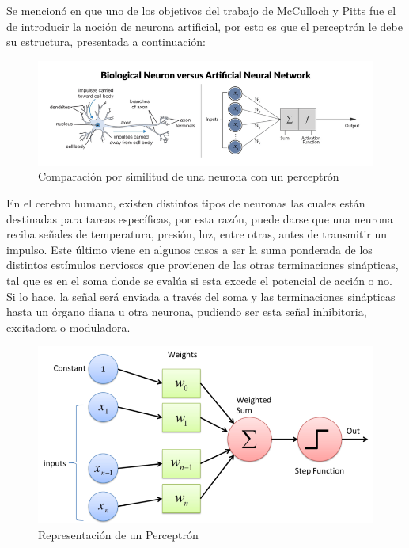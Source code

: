 \begin{itemize}
{\begin{enumerate}
\begin{enumerate}
{             Se mencionó en \cite{29} que uno de los objetivos del trabajo de McCulloch y Pitts fue el de introducir la noción de neurona artificial, por esto es que el perceptrón le debe su estructura, presentada a continuación:
             
            \begin{figure}[h!]
                \centering
                \includegraphics[scale=0.5]{./images/nn}
                \caption{Comparación por similitud de una neurona con un perceptrón}
                \label{fig:NN}
            \end{figure}
            
            En el cerebro humano, existen distintos tipos de neuronas las cuales están destinadas para tareas específicas, por esta razón, puede darse que una neurona reciba señales de temperatura, presión, luz, entre otras, antes de transmitir un impulso. Este último viene en algunos casos a ser la suma ponderada de los distintos estímulos nerviosos que provienen de las otras terminaciones sinápticas, tal que es en el soma donde se evalúa si esta excede el potencial de acción o no. Si lo hace, la señal será enviada a través del soma y las terminaciones sinápticas hasta un órgano diana u otra neurona, pudiendo ser esta señal inhibitoria, excitadora o moduladora.\\
            
            \begin{figure}
                \centering
                \includegraphics[scale=0.35]{./images/perceptron}
                \caption{Representación de un Perceptrón}
                \label{fig:Perceptron}
            \end{figure}
            
}
\end{enumerate}
\end{enumerate}}
\end{itemize}
